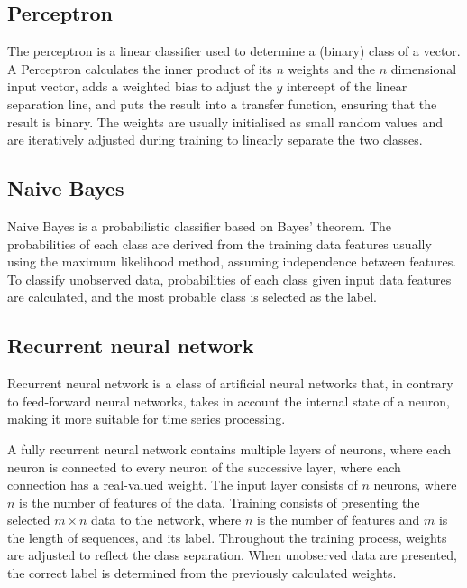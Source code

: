 \subsection{Perceptron}
The perceptron is a linear classifier used to determine a (binary) class of a vector. A Perceptron calculates the inner product of its $n$ weights and the $n$ dimensional input vector, adds a weighted bias to adjust the $y$ intercept of the linear separation line, and puts the result into a transfer function, ensuring that the result is binary. The weights are usually initialised as small random values and are iteratively adjusted during training to linearly separate the two classes.

\subsection{Naive Bayes}
Naive Bayes is a probabilistic classifier based on Bayes' theorem. The probabilities of each class are derived from the training data features usually using the maximum likelihood method, assuming independence between features. To classify unobserved data, probabilities of each class given input data features are calculated, and the most probable class is selected as the label.

\subsection{Recurrent neural network}
Recurrent neural network is a class of artificial neural networks that, in contrary to feed-forward neural networks, takes in account the internal state of a neuron, making it more suitable for time series processing.\\

\par
A fully recurrent neural network contains multiple layers of neurons, where each neuron is connected to every neuron of the successive layer, where each connection has a real-valued weight. The input layer consists of $n$ neurons, where $n$ is the number of features of the data. Training consists of presenting the selected $m \times n$ data to the network, where $n$ is the number of features and $m$ is the length of sequences, and its label. Throughout the training process, weights are adjusted to reflect the class separation. When unobserved data are presented, the correct label is determined from the previously calculated weights.


